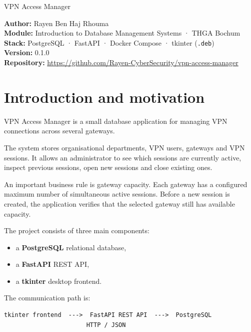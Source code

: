 \documentclass[11pt,a4paper]{article}
\begin{document}
\thispagestyle{empty}

%
{VPN Access Manager}

\begin{infobox}
\textbf{Author:} Rayen Ben Haj Rhouma \\
\textbf{Module:} Introduction to Database Management Systems · THGA Bochum \\
\textbf{Stack:} PostgreSQL · FastAPI · Docker Compose · tkinter (\texttt{.deb}) \\
\textbf{Version:} 0.1.0 \\
\textbf{Repository:} \url{https://github.com/Rayen-CyberSecurity/vpn-access-manager}
\end{infobox}

\tableofcontents
\vspace{1em}

\section{Introduction and motivation}

VPN Access Manager is a small database application for managing VPN
connections across several gateways.

The system stores organisational departments, VPN users, gateways and VPN
sessions. It allows an administrator to see which sessions are currently
active, inspect previous sessions, open new sessions and close existing ones.

An important business rule is gateway capacity. Each gateway has a configured
maximum number of simultaneous active sessions. Before a new session is
created, the application verifies that the selected gateway still has
available capacity.

The project consists of three main components:

\begin{itemize}
    \item a \textbf{PostgreSQL} relational database,
    \item a \textbf{FastAPI} REST API,
    \item a \textbf{tkinter} desktop frontend.
\end{itemize}

The communication path is:

\begin{verbatim}
tkinter frontend  --->  FastAPI REST API  --->  PostgreSQL
                       HTTP / JSON
\end{verbatim}
\end{document}
